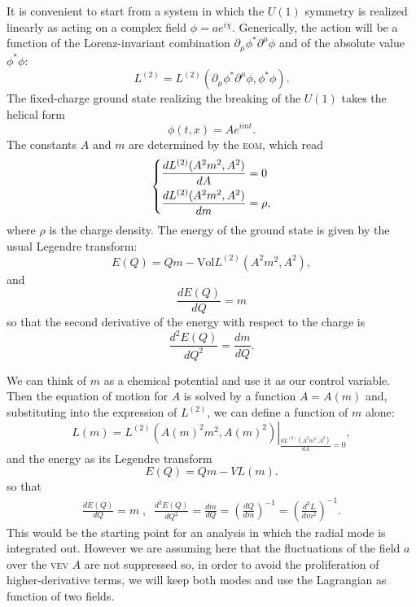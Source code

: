 \documentclass[11pt]{article}
\numberwithin{equation}{section}
\newcommand*{\del}{\partial}
\begin{document}
It is convenient to start from a system in which the \(U(1)\) symmetry is realized linearly as acting on a complex field \(\phi = a e^{i \chi}\).
Generically, the action will be a function of the Lorenz-invariant combination \(\del_{\mu} \phi^{*} \del^{\mu} \phi\) and of the absolute value \(\phi^{*} \phi\):
\begin{equation}
  L^{(2)} = L^{(2)}(\del_{\mu} \phi^{*} \del^{\mu} \phi, \phi^{*} \phi ) .
\end{equation}
The fixed-charge ground state realizing the breaking of the \(U(1)\) takes the helical form
\begin{equation}
  \phi(t,x) = A e^{i m t} .
\end{equation}
The constants \(A\) and \(m\) are determined by the \textsc{eom}, which read
\begin{equation}
  \begin{dcases}
    \frac{d L^{(2)}(A^2 m^2, A^2)}{d A} = 0 \\
    \frac{d L^{(2)}(A^2 m^2, A^2)}{d m} = \rho ,\\
  \end{dcases}
\end{equation}
where \(\rho\) is the charge density.
The energy of the ground state is given by the usual Legendre transform:
\begin{equation}
  E(Q) = Q m - \mathrm{Vol} L^{(2)}(A^2 m^2, A^2),
\end{equation}
and
\begin{equation}
  \frac{d E(Q)}{dQ} = m
\end{equation}
so that the second derivative of the energy with respect to the charge is
\begin{equation}
  \frac{d^2 E(Q)}{dQ^2} = \frac{d m}{dQ} .
\end{equation}

We can think of \(m\) as a chemical potential and use it as our control variable.
Then the equation of motion for \(A\) is solved by a function \(A = A(m)\) and, substituting into the expression of \(L^{(2)}\), we can define a function of \(m\) alone:
\begin{equation}
  L(m) = \left. L^{(2)}(A(m)^2 m^2, A(m)^2 ) \right|_{\frac{d L^{(2)}(A^2 m^2, A^2)}{d A} = 0} ,
\end{equation}
and the energy as its Legendre transform
\begin{equation}
  E(Q) = Q m - V L(m) .
\end{equation}
so that
\begin{align}
  \frac{d E(Q)}{dQ} = m  \;,\;\;\frac{d^2 E(Q)}{dQ^2} = \frac{d m}{dQ} = \left( \frac{d Q}{dm}  \right)^{-1} = \left( \frac{d^2 L}{d m^2}  \right)^{-1} .
\end{align}
This would be the starting point for an analysis in which the radial mode is integrated out.
However we are assuming here that the fluctuations of the field \(a\) over the \textsc{vev} \(A\) are not suppressed so, in order to avoid the proliferation of higher-derivative terms, we will keep both modes and use the Lagrangian as function of two fields.
\end{document}
